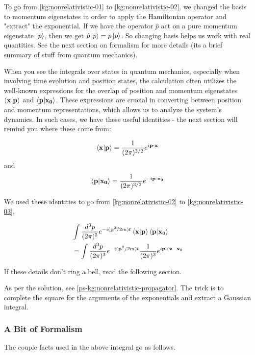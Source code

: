 To go from \ref{kg:nonrelativistic-01} to \ref{kg:nonrelativistic-02},
we changed the basis to momentum eigenstates in order to apply the Hamiltonian operator and "extract" the exponential.
If we have the operator $\hat{p}$ act on a pure momentum eigenstate $\ket{p}$, then we get $\hat{p}\ket{p} = p\ket{p}$.
So changing basis helps us work with real quantities.
See the next section on formalism for more details (its a brief summary of stuff from quantum mechanics).


When you see the integrals over states in quantum mechanics, especially when involving time evolution and position states,
the calculation often utilizes the well-known expressions for the overlap of position and momentum eigenstates
$\braket{\boldsymbol{\mathbf{x}} | \boldsymbol{\mathbf{p}}}$ and $\braket{\boldsymbol{\mathbf{p}} | \boldsymbol{\mathbf{x_0}}}$.
These expressions are crucial in converting between position and momentum representations,
which allows us to analyze the system's dynamics.
In such cases, we have these useful identities - the next section will remind you where these come from:

$$
\braket{\boldsymbol{\mathbf{x}} | \boldsymbol{\mathbf{p}}} = \frac{1}{(2\pi)^{3/2}} e^{i\boldsymbol{\mathbf{p}}\cdot\boldsymbol{\mathbf{x}}}
$$
and 
$$
\braket{\boldsymbol{\mathbf{p}} | \boldsymbol{\mathbf{x_0}}} = \frac{1}{(2\pi)^{3/2}} e^{-i\boldsymbol{\mathbf{p}}\cdot\boldsymbol{\mathbf{x_0}}}
$$

We used these identities to go from \ref{kg:nonrelativistic-02} to \ref{kg:nonrelativistic-03},

\begin{align*}
& \int \frac{d^3p}{(2\pi)^3} e^{-i(\boldsymbol{\mathbf{p}}^2/2m)t} \braket{\boldsymbol{\mathbf{x}} | \boldsymbol{\mathbf{p}}} \braket{\boldsymbol{\mathbf{p}} | \boldsymbol{\mathbf{x}}_0} \\
&= \int \frac{d^3p}{(2\pi)^3} e^{-i(\boldsymbol{\mathbf{p}}^2/2m)t} \frac{1}{(2\pi)^3} e^{i\boldsymbol{\mathbf{p}}\cdot(\boldsymbol{\mathbf{x}}-\boldsymbol{\mathbf{x}}_0} 
\end{align*}

If these details don't ring a bell, read the following section.


As per the solution, see \ref{ps-kg:nonrelativistic-propagator}.
The trick is to complete the square for the arguments of the exponentials and extract a Gaussian integral.


\subsubsection{A Bit of Formalism}

The couple facts used in the above integral go as follows.


